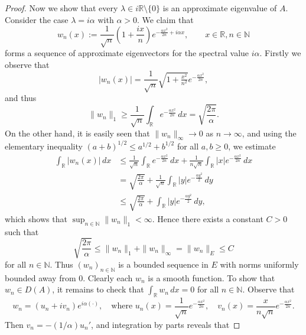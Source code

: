 \documentclass[sn-mathphys]{sn-jnl}%
\theoremstyle{thmstyleone}
\theoremstyle{thmstylethree}
\newcommand{\NN}{\mathbb{N}}
\newcommand{\RR}{\mathbb{R}}
\begin{document}
\begin{proof}
	Now we show that every $\lambda\in i\RR \setminus\{0\}$ is an approximate eigenvalue of $A$. Consider the case $\lambda=i\alpha$ with $\alpha>0$. We claim that
	\begin{equation}
		w_n(x) := \frac{1}{\sqrt{n}}\left(1+\frac{ix}{n}\right) e^{-\frac{\alpha x^2}{2n} + i\alpha x}, \qquad x\in\RR, n\in\NN
	\end{equation}
	forms a sequence of approximate eigenvectors for the spectral value $i\alpha$. Firstly we observe that
	\begin{equation*}
		\lvert w_n(x)\rvert = \frac{1}{\sqrt{n}} \sqrt{1+\tfrac{x^2}{n^2}} e^{-\frac{\alpha x^2}{2n}},
	\end{equation*}
	and thus
	\begin{equation*}
		\|w_n\|_1 \ge \frac{1}{\sqrt{n}}\int_\RR e^{-\frac{\alpha x^2}{2n}} \,dx = \sqrt{\frac{2\pi}{\alpha}}.
	\end{equation*}
	On the other hand, it is easily seen that $\|w_n\|_\infty \to 0$ as $n\to\infty$, and using the elementary inequality $(a+b)^{1/2} \le a^{1/2} + b^{1/2}$ for all $a,b\ge 0$, we estimate
	\begin{align*}
		\int_\RR \lvert w_n(x)\rvert \,dx &\le \frac{1}{\sqrt{n}}\int_\RR e^{-\frac{\alpha x^2}{2n}} \,dx + \frac{1}{n\sqrt{n}}\int_\RR \lvert x\rvert e^{-\frac{\alpha x^2}{2n}}\,dx \\
		&= \sqrt{\frac{2\pi}{\alpha}} + \frac{1}{\sqrt{n}} \int_\RR \lvert y\rvert e^{-\frac{\alpha y^2}{2}} \,dy \\
		&\le \sqrt{\frac{2\pi}{\alpha}} + \int_\RR \lvert y\rvert e^{-\frac{\alpha y^2}{2}} \,dy,
	\end{align*}
	which shows that $\sup_{n\in\NN}\|w_n\|_1 <\infty$. Hence there exists a constant $C>0$ such that
	\begin{equation*}
		\sqrt{\frac{2\pi}{\alpha}} \le \|w_n\|_1 + \|w_n\|_\infty = \|w_n\|_E \le C
	\end{equation*}
	for all $n\in\NN$. Thus $(w_n)_{n\in\NN}$ is a bounded sequence in $E$ with norms uniformly bounded away from 0. Clearly each $w_n$ is a smooth function. To show that $w_n\in D(A)$, it remains to check that $\int_\RR w_n \,dx = 0$ for all $n\in\NN$. Observe that
	\begin{equation*}
		w_n = (u_n+iv_n)e^{i\alpha(\cdot)}, \quad\text{where } u_n(x)=\frac{1}{\sqrt{n}} e^{-\frac{\alpha x^2}{2n}}, \quad v_n(x)=\frac{x}{n\sqrt{n}}e^{-\frac{\alpha x^2}{2n}}.
	\end{equation*}
	Then $v_n = -(1/\alpha)u_n'$, and integration by parts reveals that

\end{proof}
\end{document}
